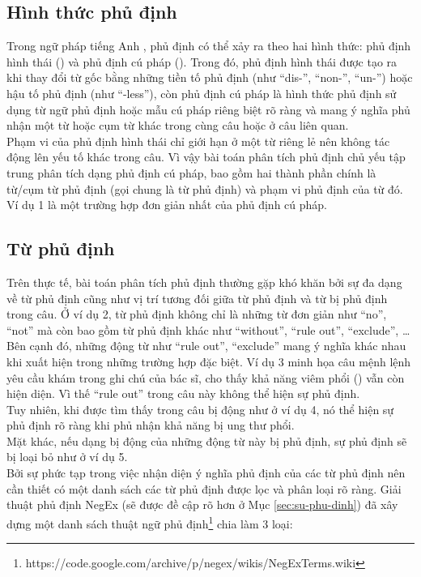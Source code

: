 \subsection*{Hình thức phủ định}

Trong ngữ pháp tiếng Anh \cite{Givon1993}, phủ định có thể xảy ra theo hai hình thức: phủ định hình thái () và phủ định cú pháp (). Trong đó, phủ định hình thái được tạo ra khi thay đổi từ gốc bằng những tiền tố phủ định (như ``dis-'', ``non-'', ``un-'') hoặc hậu tố phủ định (như ``-less''), còn phủ định cú pháp là hình thức phủ định sử dụng từ ngữ phủ định hoặc mẫu cú pháp riêng biệt rõ ràng và mang ý nghĩa phủ nhận một từ hoặc cụm từ khác trong cùng câu hoặc ở câu liên quan.\\

Phạm vi của phủ định hình thái chỉ giới hạn ở một từ riêng lẻ nên không tác động lên yếu tố khác trong câu. Vì vậy bài toán phân tích phủ định chủ yếu tập trung phân tích dạng phủ định cú pháp, bao gồm hai thành phần chính là từ/cụm từ phủ định (gọi chung là từ phủ định) và phạm vi phủ định của từ đó. Ví dụ 1 là một trường hợp đơn giản nhất của phủ định cú pháp.

\subsection*{Từ phủ định}

Trên thực tế, bài toán phân tích phủ định thường gặp khó khăn bởi sự đa dạng về từ phủ định cũng như vị trí tương đối giữa từ phủ định và từ bị phủ định trong câu. Ở ví dụ 2, từ phủ định không chỉ là những từ đơn giản như ``no'', ``not'' mà còn bao gồm từ phủ định khác như ``without'', ``rule out'', ``exclude'', \ldots \\
Bên cạnh đó, những động từ như ``rule out'', ``exclude'' mang ý nghĩa khác nhau khi xuất hiện trong những trường hợp đặc biệt. Ví dụ 3 minh họa câu mệnh lệnh yêu cầu khám trong ghi chú của bác sĩ, cho thấy khả năng viêm phổi () vẫn còn hiện diện. Vì thế ``rule out'' trong câu này không thể hiện sự phủ định.\\
Tuy nhiên, khi được tìm thấy trong câu bị động như ở ví dụ 4, nó thể hiện sự phủ định rõ ràng khi phủ nhận khả năng bị ung thư phổi. \\
Mặt khác, nếu dạng bị động của những động từ này bị phủ định, sự phủ định sẽ bị loại bỏ như ở ví dụ 5.\\
Bởi sự phức tạp trong việc nhận diện ý nghĩa phủ định của các từ phủ định nên cần thiết có một danh sách các từ phủ định được lọc và phân loại rõ ràng. Giải thuật phủ định NegEx (sẽ được đề cập rõ hơn ở Mục \ref{sec:su-phu-dinh}) đã xây dựng một danh sách thuật ngữ phủ định\footnote{https://code.google.com/archive/p/negex/wikis/NegExTerms.wiki} chia làm 3 loại:

